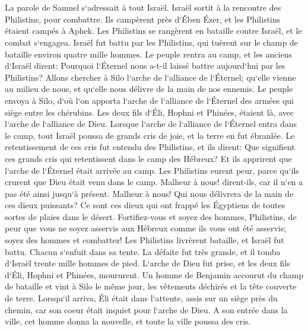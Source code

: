 \chapter{}

\verse La parole de Samuel s`adressait à tout Israël. Israël sortit à la rencontre des Philistins, pour combattre. Ils campèrent près d`Ében Ézer, et les Philistins étaient campés à Aphek. 
\verse Les Philistins se rangèrent en bataille contre Israël, et le combat s`engagea. Israël fut battu par les Philistins, qui tuèrent sur le champ de bataille environ quatre mille hommes. 
\verse Le peuple rentra au camp, et les anciens d`Israël dirent: Pourquoi l`Éternel nous a-t-il laissé battre aujourd`hui par les Philistins? Allons chercher à Silo l`arche de l`alliance de l`Éternel; qu`elle vienne au milieu de nous, et qu`elle nous délivre de la main de nos ennemis. 
\verse Le peuple envoya à Silo, d`où l`on apporta l`arche de l`alliance de l`Éternel des armées qui siège entre les chérubins. Les deux fils d`Éli, Hophni et Phinées, étaient là, avec l`arche de l`alliance de Dieu. 
\verse Lorsque l`arche de l`alliance de l`Éternel entra dans le camp, tout Israël poussa de grands cris de joie, et la terre en fut ébranlée. 
\verse Le retentissement de ces cris fut entendu des Philistins, et ils dirent: Que signifient ces grands cris qui retentissent dans le camp des Hébreux? Et ils apprirent que l`arche de l`Éternel était arrivée au camp. 
\verse Les Philistins eurent peur, parce qu`ils crurent que Dieu était venu dans le camp. Malheur à nous! dirent-ils, car il n`en a pas été ainsi jusqu`à présent. 
\verse Malheur à nous! Qui nous délivrera de la main de ces dieux puissants? Ce sont ces dieux qui ont frappé les Égyptiens de toutes sortes de plaies dans le désert. 
\verse Fortifiez-vous et soyez des hommes, Philistins, de peur que vous ne soyez asservis aux Hébreux comme ils vous ont été asservis; soyez des hommes et combattez! 
\verse Les Philistins livrèrent bataille, et Israël fut battu. Chacun s`enfuit dans sa tente. La défaite fut très grande, et il tomba d`Israël trente mille hommes de pied. 
\verse L`arche de Dieu fut prise, et les deux fils d`Éli, Hophni et Phinées, moururent. 
\verse Un homme de Benjamin accourut du champ de bataille et vint à Silo le même jour, les vêtements déchirés et la tête couverte de terre. 
\verse Lorsqu`il arriva, Éli était dans l`attente, assis sur un siège près du chemin, car son coeur était inquiet pour l`arche de Dieu. A son entrée dans la ville, cet homme donna la nouvelle, et toute la ville poussa des cris. 
